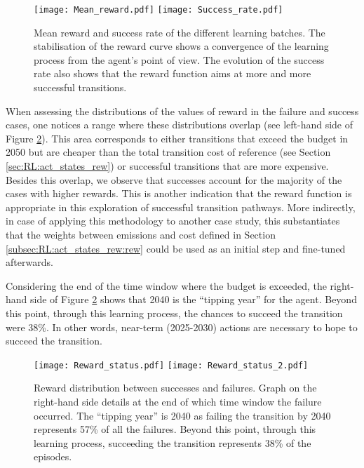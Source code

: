 \begin{figure}[!htbp]
\centering
\texttt{[image: Mean\_reward.pdf]}
\texttt{[image: Success\_rate.pdf]}
\caption{Mean reward and success rate of the different learning batches. The stabilisation of the reward curve shows a convergence of the learning process from the agent's point of view. The evolution of the success rate also shows that the reward function aims at more and more successful transitions.}
\label{fig:reward_success}
\end{figure}

\newpage
When assessing the distributions of the values of reward in the failure and success cases, one notices a range where these distributions overlap (see left-hand side of Figure \ref{fig:reward_status}). This area corresponds to either transitions that exceed the  budget in 2050 but are cheaper than the total transition cost of reference (see Section \ref{sec:RL:act_states_rew}) or successful transitions that are more expensive. Besides this overlap, we observe that successes account for the majority of the cases with higher rewards. This is another indication that the reward function is appropriate in this exploration of successful transition pathways. More indirectly, in case of applying this methodology to another case study, this substantiates that the weights between emissions and cost defined in Section \ref{subsec:RL:act_states_rew:rew} could be used as an initial step and fine-tuned afterwards.

Considering the end of the time window where the  budget is exceeded, the right-hand side of Figure \ref{fig:reward_status} shows that 2040 is the ``tipping year'' for the agent. Beyond this point, through this learning process, the chances to succeed the transition were 38\%. In other words, near-term (2025-2030) actions are necessary to hope to succeed the transition.

\begin{figure}[!htbp]
\centering
\texttt{[image: Reward\_status.pdf]}
\texttt{[image: Reward\_status\_2.pdf]}
\caption{Reward distribution between successes and failures. Graph on the right-hand side details at the end of which time window the failure occurred. The ``tipping year'' is 2040 as failing the transition by 2040 represents 57\% of all the failures. Beyond this point, through this learning process, succeeding the transition represents 38\% of the episodes. }
\label{fig:reward_status}
\end{figure}

